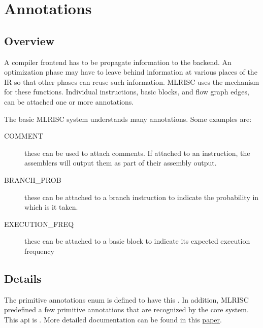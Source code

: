 \section{Annotations}

\subsection{Overview}
A compiler frontend has to be propagate information to
the backend.  An optimization phase may have to leave behind information
at various places of the IR so that other phases can reuse such information.
MLRISC uses the 
mechanism for these functions.  
Individual instructions, basic blocks, and flow graph edges, 
can be attached one or more annotations.  

The basic MLRISC system understands many annotations.  Some examples are:
\begin{description}
   \item[COMMENT] 
         these can be used to attach comments.  If attached to
         an instruction, the assemblers will output 
         them as part of their assembly output.
   \item[BRANCH\_PROB]
          these can be attached to a branch instruction to indicate
          the probability in which is it taken.
   \item[EXECUTION\_FREQ]
          these can be attached to a basic block to indicate 
          its expected execution frequency 
\end{description}

\subsection{Details}
The primitive annotations enum is defined
to have this .
In addition, MLRISC predefined a few primitive annotations that are
recognized by the core system.  This api is
.
More detailed documentation can be found in this 
\href{http://cm.bell-labs.com/cm/cs/what/smlnj/compiler-notes/annotations.ps}{paper}.
